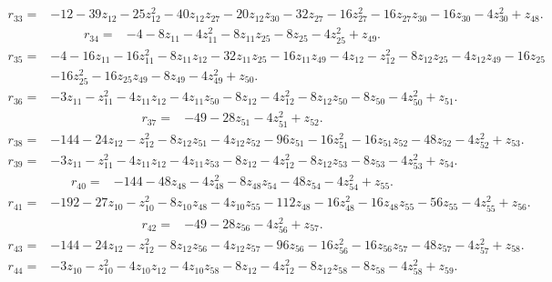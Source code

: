 \begin{align*}
 r_{33}={}&-12-39z_{12}-25z_{12}^{2}-40z_{12}z_{27}-20z_{12}z_{30}-32z_{27}-16z_{27}^{2}-16z_{27}z_{30}-16z_{30}-4z_{30}^{2}+z_{48} .
\end{align*}
\begin{align*}
 r_{34}={}&-4-8z_{11}-4z_{11}^{2}-8z_{11}z_{25}-8z_{25}-4z_{25}^{2}+z_{49} .
\end{align*}
\begin{align*}
 r_{35}={}&-4-16z_{11}-16z_{11}^{2}-8z_{11}z_{12}-32z_{11}z_{25}-16z_{11}z_{49}-4z_{12}-z_{12}^{2}-8z_{12}z_{25}-4z_{12}z_{49}-16z_{25}\\
 &-16z_{25}^{2}-16z_{25}z_{49}-8z_{49}-4z_{49}^{2}+z_{50} .
\end{align*}
\begin{align*}
 r_{36}={}&-3z_{11}-z_{11}^{2}-4z_{11}z_{12}-4z_{11}z_{50}-8z_{12}-4z_{12}^{2}-8z_{12}z_{50}-8z_{50}-4z_{50}^{2}+z_{51} .
\end{align*}
\begin{align*}
 r_{37}={}&-49-28z_{51}-4z_{51}^{2}+z_{52} .
\end{align*}
\begin{align*}
 r_{38}={}&-144-24z_{12}-z_{12}^{2}-8z_{12}z_{51}-4z_{12}z_{52}-96z_{51}-16z_{51}^{2}-16z_{51}z_{52}-48z_{52}-4z_{52}^{2}+z_{53} .
\end{align*}
\begin{align*}
 r_{39}={}&-3z_{11}-z_{11}^{2}-4z_{11}z_{12}-4z_{11}z_{53}-8z_{12}-4z_{12}^{2}-8z_{12}z_{53}-8z_{53}-4z_{53}^{2}+z_{54} .
\end{align*}
\begin{align*}
 r_{40}={}&-144-48z_{48}-4z_{48}^{2}-8z_{48}z_{54}-48z_{54}-4z_{54}^{2}+z_{55} .
\end{align*}
\begin{align*}
 r_{41}={}&-192-27z_{10}-z_{10}^{2}-8z_{10}z_{48}-4z_{10}z_{55}-112z_{48}-16z_{48}^{2}-16z_{48}z_{55}-56z_{55}-4z_{55}^{2}+z_{56} .
\end{align*}
\begin{align*}
 r_{42}={}&-49-28z_{56}-4z_{56}^{2}+z_{57} .
\end{align*}
\begin{align*}
 r_{43}={}&-144-24z_{12}-z_{12}^{2}-8z_{12}z_{56}-4z_{12}z_{57}-96z_{56}-16z_{56}^{2}-16z_{56}z_{57}-48z_{57}-4z_{57}^{2}+z_{58} .
\end{align*}
\begin{align*}
 r_{44}={}&-3z_{10}-z_{10}^{2}-4z_{10}z_{12}-4z_{10}z_{58}-8z_{12}-4z_{12}^{2}-8z_{12}z_{58}-8z_{58}-4z_{58}^{2}+z_{59} .
\end{align*}

